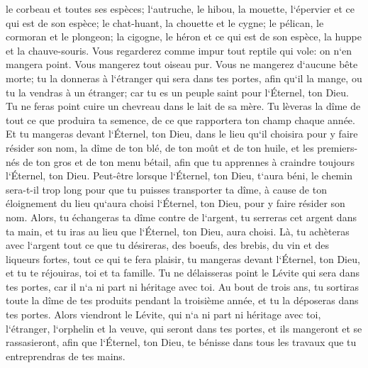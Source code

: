 \verse le corbeau et toutes ses espèces; 
\verse l`autruche, le hibou, la mouette, l`épervier et ce qui est de son espèce; 
\verse le chat-huant, la chouette et le cygne; 
\verse le pélican, le cormoran et le plongeon; 
\verse la cigogne, le héron et ce qui est de son espèce, la huppe et la chauve-souris. 
\verse Vous regarderez comme impur tout reptile qui vole: on n`en mangera point. 
\verse Vous mangerez tout oiseau pur. 
\verse Vous ne mangerez d`aucune bête morte; tu la donneras à l`étranger qui sera dans tes portes, afin qu`il la mange, ou tu la vendras à un étranger; car tu es un peuple saint pour l`Éternel, ton Dieu. Tu ne feras point cuire un chevreau dans le lait de sa mère. 
\verse Tu lèveras la dîme de tout ce que produira ta semence, de ce que rapportera ton champ chaque année. 
\verse Et tu mangeras devant l`Éternel, ton Dieu, dans le lieu qu`il choisira pour y faire résider son nom, la dîme de ton blé, de ton moût et de ton huile, et les premiers-nés de ton gros et de ton menu bétail, afin que tu apprennes à craindre toujours l`Éternel, ton Dieu. 
\verse Peut-être lorsque l`Éternel, ton Dieu, t`aura béni, le chemin sera-t-il trop long pour que tu puisses transporter ta dîme, à cause de ton éloignement du lieu qu`aura choisi l`Éternel, ton Dieu, pour y faire résider son nom. 
\verse Alors, tu échangeras ta dîme contre de l`argent, tu serreras cet argent dans ta main, et tu iras au lieu que l`Éternel, ton Dieu, aura choisi. 
\verse Là, tu achèteras avec l`argent tout ce que tu désireras, des boeufs, des brebis, du vin et des liqueurs fortes, tout ce qui te fera plaisir, tu mangeras devant l`Éternel, ton Dieu, et tu te réjouiras, toi et ta famille. 
\verse Tu ne délaisseras point le Lévite qui sera dans tes portes, car il n`a ni part ni héritage avec toi. 
\verse Au bout de trois ans, tu sortiras toute la dîme de tes produits pendant la troisième année, et tu la déposeras dans tes portes. 
\verse Alors viendront le Lévite, qui n`a ni part ni héritage avec toi, l`étranger, l`orphelin et la veuve, qui seront dans tes portes, et ils mangeront et se rassasieront, afin que l`Éternel, ton Dieu, te bénisse dans tous les travaux que tu entreprendras de tes mains. 

